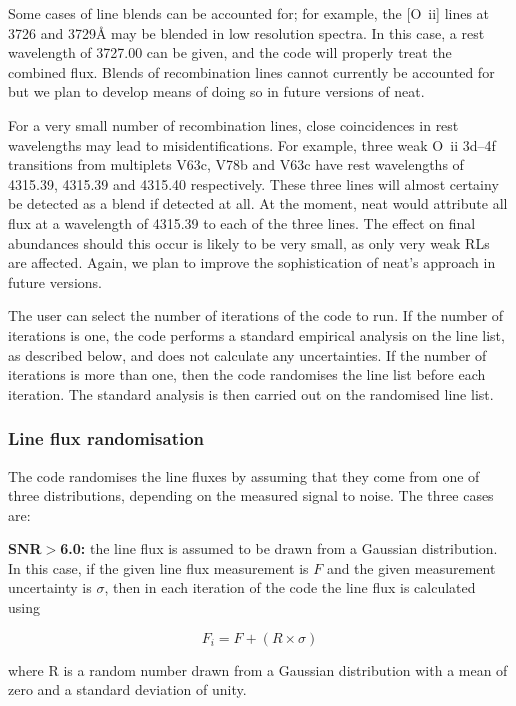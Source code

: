 \documentclass[useAMS,usenatbib]{mn2e}
\begin{document}
Some cases of line blends can be accounted for; for example, the [O~{\sc ii}] lines at 3726 and 3729{\AA} may be blended in low resolution spectra.  In this case, a rest wavelength of 3727.00 can be given, and the code will properly treat the combined flux.  Blends of recombination lines cannot currently be accounted for but we plan to develop means of doing so in future versions of {\sc neat}.

For a very small number of recombination lines, close coincidences in rest wavelengths may lead to misidentifications.  For example, three weak O~{\sc ii} 3d--4f transitions from multiplets V63c, V78b and V63c have rest wavelengths of 4315.39, 4315.39 and 4315.40 respectively.  These three lines will almost certainy be detected as a blend if detected at all.  At the moment, {\sc neat} would attribute all flux at a wavelength of 4315.39 to each of the three lines.  The effect on final abundances should this occur is likely to be very small, as only very weak RLs are affected.  Again, we plan to improve the sophistication of {\sc neat}'s approach in future versions.

The user can select the number of iterations of the code to run.  If the number of iterations is one, the code performs a standard empirical analysis on the line list, as described below, and does not calculate any uncertainties.  If the number of iterations is more than one, then the code randomises the line list before each iteration.  The standard analysis is then carried out on the randomised line list.

\subsubsection{Line flux randomisation}
\label{randomising}

The code randomises the line fluxes by assuming that they come from one of three distributions, depending on the measured signal to noise.  The three cases are:

{\bf SNR$>$6.0: } the line flux is assumed to be drawn from a Gaussian distribution.  In this case, if the given line flux measurement is $F$ and the given measurement uncertainty is $\sigma$, then in each iteration of the code the line flux is calculated using

\begin{equation}
F_i = F + (R\times\sigma)
\end{equation}

where R is a random number drawn from a Gaussian distribution with a mean of zero and a standard deviation of unity.
\end{document}
